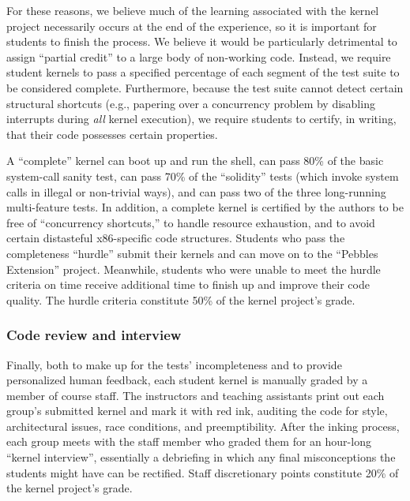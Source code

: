For these reasons, we believe much of the learning
associated with the kernel project necessarily occurs
at the end of the experience,
so it is important for students to finish the process.
We believe it would be particularly detrimental to
assign ``partial credit'' to a large body of non-working
code.
Instead, we require student kernels to pass a
specified percentage of each segment of the test
suite to be considered complete.
Furthermore,
because the test suite cannot detect certain
structural shortcuts (e.g., papering over a concurrency
problem by disabling interrupts during \textit{all}
kernel execution),
we require students to certify, in writing, that
their code possesses certain properties.

A ``complete'' kernel can boot up and run the shell,
can pass 80\% of the basic system-call sanity test,
can pass 70\% of the ``solidity'' tests (which
invoke system calls in illegal or non-trivial ways),
and can pass two of the three long-running multi-feature tests.
In addition,
a complete kernel is certified by the authors to
be free of ``concurrency shortcuts,''
to handle resource exhaustion,
and to avoid certain distasteful x86-specific code structures.
%
Students who pass the completeness ``hurdle'' submit their kernels
and can move on to the ``Pebbles Extension'' project.
Meanwhile, students who were unable to meet the
hurdle criteria on time receive additional time
to finish up and improve their code quality.
The hurdle criteria constitute 50\% of the kernel project's grade.

\subsubsection{Code review and interview}

Finally, both to make up for the tests' incompleteness and to provide personalized human feedback, each student kernel is manually graded by a member of course staff.
The instructors and teaching assistants print out each group's submitted kernel and mark it with red ink, auditing the code for style, architectural issues, race conditions, and preemptibility.
After the inking process, each group meets with the staff member who graded them for an hour-long ``kernel interview'', essentially a debriefing in which any final misconceptions the students might have can be rectified.
Staff discretionary points constitute 20\% of the kernel project's grade.
